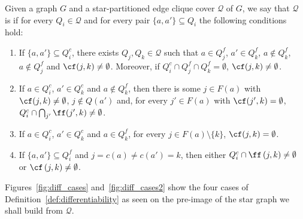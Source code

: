 \begin{definition}
    \label{def:differentiability}
    Given a graph $G$ and a star-partitioned edge clique cover $\mathcal{Q}$ of $G$, we say that $\mathcal{Q}$ is  if for every $Q_i \in \mathcal{Q}$ and for every pair $\{a, a'\} \subseteq Q_i$ the following conditions hold:
    \begin{enumerate}
        \item If $\{a, a'\} \subseteq Q_i^c$, there exists $Q_j, Q_k \in \mathcal{Q}$ such that $a \in Q_j^f$, $a' \in Q_k^f$, $a \notin Q_k^f$, $a \notin Q_j^f$ and $\cf(j,k) \neq \emptyset$. Moreover, if $Q_i^c \cap Q_j^f \cap Q_k^f = \emptyset$, $\cf(j,k) \neq \emptyset$.
        \item If $a \in Q_i^c$, $a' \in Q_k^c$ and $a \notin Q_k^f$, then there is some $j \in F(a)$ with $\cf(j,k) \neq \emptyset$, $j \notin Q(a')$ and, for every $j' \in F(a)$ with $\cf(j',k) = \emptyset$, $Q_i^c \cap \bigcap_{j'} \ff(j',k) \neq \emptyset$.
        \item If $a \in Q_i^c$, $a' \in Q_k^c$ and $a \in Q_k^f$, for every $j \in F(a) \setminus \{k\}$, $\cf(j,k) = \emptyset$.
        \item If $\{a, a'\} \subseteq Q_i^f$ and $j = c(a) \neq c(a') = k$, then either $Q_i^c \cap \ff\left(j,k\right) \neq \emptyset$ or $\cf\left(j,k\right) \neq \emptyset$.
    \end{enumerate}
\end{definition}

Figures~\ref{fig:diff_cases} and~\ref{fig:diff_cases2} show the four cases of Definition~\ref{def:differentiability} as seen on the pre-image of the star graph we shall build from $\mathcal{Q}$.

